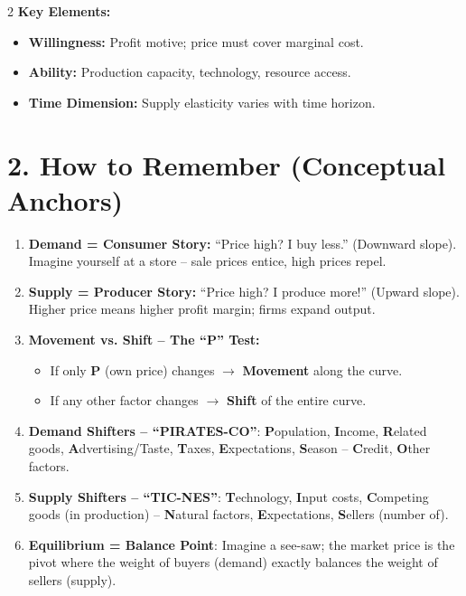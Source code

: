 \documentclass[10pt,a4paper]{article}
\begin{document}
\begin{multicols}{2}
\textbf{Key Elements:}
\begin{itemize}[leftmargin=*,nosep]
    \item \textbf{Willingness:} Profit motive; price must cover marginal cost.
    \item \textbf{Ability:} Production capacity, technology, resource access.
    \item \textbf{Time Dimension:} Supply elasticity varies with time horizon.
\end{itemize}

\section*{2. How to Remember (Conceptual Anchors)}

\begin{enumerate}[leftmargin=*,nosep]
    \item \textbf{Demand = Consumer Story:} ``Price high? I buy less.'' (Downward slope). Imagine yourself at a store -- sale prices entice, high prices repel.
    \item \textbf{Supply = Producer Story:} ``Price high? I produce more!'' (Upward slope). Higher price means higher profit margin; firms expand output.
    \item \textbf{Movement vs. Shift -- The ``P'' Test:}
    \begin{itemize}[nosep]
        \item If only \textbf{P} (own price) changes $\to$ \textbf{Movement} along the curve.
        \item If any other factor changes $\to$ \textbf{Shift} of the entire curve.
    \end{itemize}
    \item \textbf{Demand Shifters -- ``PIRATES-CO''}: \textbf{P}opulation, \textbf{I}ncome, \textbf{R}elated goods, \textbf{A}dvertising/Taste, \textbf{T}axes, \textbf{E}xpectations, \textbf{S}eason -- \textbf{C}redit, \textbf{O}ther factors.
    \item \textbf{Supply Shifters -- ``TIC-NES''}: \textbf{T}echnology, \textbf{I}nput costs, \textbf{C}ompeting goods (in production) -- \textbf{N}atural factors, \textbf{E}xpectations, \textbf{S}ellers (number of).
    \item \textbf{Equilibrium = Balance Point}: Imagine a see-saw; the market price is the pivot where the weight of buyers (demand) exactly balances the weight of sellers (supply).
\end{enumerate}


\end{multicols}
\end{document}
